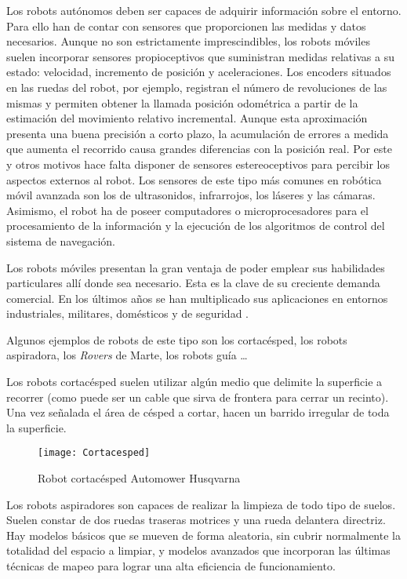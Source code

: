Los robots autónomos deben ser capaces de adquirir información sobre el entorno. Para ello han de contar con sensores que proporcionen las medidas y datos necesarios. Aunque no son estrictamente imprescindibles, los robots móviles suelen incorporar sensores propioceptivos que suministran medidas relativas a su estado: velocidad, incremento de posición y aceleraciones. Los encoders situados en las ruedas del robot, por ejemplo, re\-gistran el número de revoluciones de las mismas y permiten obtener la llamada posición odométrica a partir de la estimación del movimiento relativo incremental. Aunque esta aproximación presenta una buena precisión a corto plazo, la acumulación de errores a medida que aumenta el recorrido causa grandes diferencias con la posición real. Por este y otros motivos hace falta disponer de sensores estereoceptivos para percibir los aspectos externos al robot. Los sensores de este tipo más comunes en robótica móvil avanzada son los de ultrasonidos, infrarrojos, los láseres y las cámaras.
Asimismo, el robot ha de poseer computadores o microprocesadores para el procesamiento de la información y la ejecución de los algoritmos de control del sistema de navegación.

Los robots móviles presentan la gran ventaja de poder emplear sus habilidades particulares allí donde sea necesario. Esta es la clave de su creciente demanda comercial. En los últimos años se han multiplicado sus aplicaciones en entornos industriales, militares, domésticos y de seguridad \cite{Arranz06}.

Algunos ejemplos de robots de este tipo son los cortacésped, los robots aspiradora, los \emph{Rovers} de Marte, los robots guía \ldots

Los robots cortacésped suelen utilizar algún medio que delimite la superficie a recorrer (como puede ser un cable que sirva de frontera para cerrar un recinto). Una vez señalada el área de césped a cortar, hacen un barrido irregular de toda la superficie.

\begin{figure}[hbt]
  \centering\texttt{[image: Cortacesped]}\\
  \caption{Robot cortacésped Automower Husqvarna}\label{fg:cortacesped}
\end{figure}

Los robots aspiradores son capaces de realizar la limpieza de todo tipo de suelos. Suelen constar de dos ruedas traseras motrices y una rueda delantera directriz. Hay modelos básicos que se mueven de forma aleatoria, sin cubrir normalmente la totalidad del espacio a limpiar, y modelos avanzados que incorporan las últimas técnicas de mapeo para lograr una alta eficiencia de funcionamiento.

